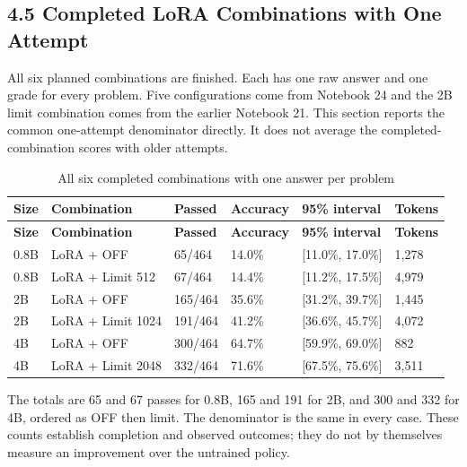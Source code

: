 \documentclass[11pt,letterpaper]{article}
\begin{document}
\subsection*{4.5 Completed LoRA Combinations with One Attempt}

All six planned combinations are finished. Each has one raw answer and one grade for every problem. Five configurations come from Notebook 24 and the 2B limit combination comes from the earlier Notebook 21. This section reports the common one-attempt denominator directly. It does not average the completed-combination scores with older attempts.\par

\begingroup\singlespacing\small\setlength{\tabcolsep}{4pt}
\begin{longtable}{|p{0.913in}|p{0.913in}|p{0.913in}|p{0.913in}|p{0.913in}|p{0.913in}|}
\caption{All six completed combinations with one answer per problem}\label{tab:completed}\\
\hline
\textbf{Size} & \textbf{Combination} & \textbf{Passed} & \textbf{Accuracy} & \textbf{95\% interval} & \textbf{Tokens}\\\hline
\endfirsthead
\hline
\textbf{Size} & \textbf{Combination} & \textbf{Passed} & \textbf{Accuracy} & \textbf{95\% interval} & \textbf{Tokens}\\\hline
\endhead
0.8B & LoRA + OFF & 65/464 & 14.0\% & [11.0\%, 17.0\%] & 1,278\\\hline
0.8B & LoRA + Limit  512 & 67/464 & 14.4\% & [11.2\%, 17.5\%] & 4,979\\\hline
2B & LoRA + OFF & 165/464 & 35.6\% & [31.2\%, 39.7\%] & 1,445\\\hline
2B & LoRA + Limit  1024 & 191/464 & 41.2\% & [36.6\%, 45.7\%] & 4,072\\\hline
4B & LoRA + OFF & 300/464 & 64.7\% & [59.9\%, 69.0\%] & 882\\\hline
4B & LoRA + Limit  2048 & 332/464 & 71.6\% & [67.5\%, 75.6\%] & 3,511\\\hline
\end{longtable}
\endgroup

The totals are 65 and 67 passes for 0.8B, 165 and 191 for 2B, and 300 and 332 for 4B, ordered as OFF then limit. The denominator is the same in every case. These counts establish completion and observed outcomes; they do not by themselves measure an improvement over the untrained policy.\par
\end{document}
